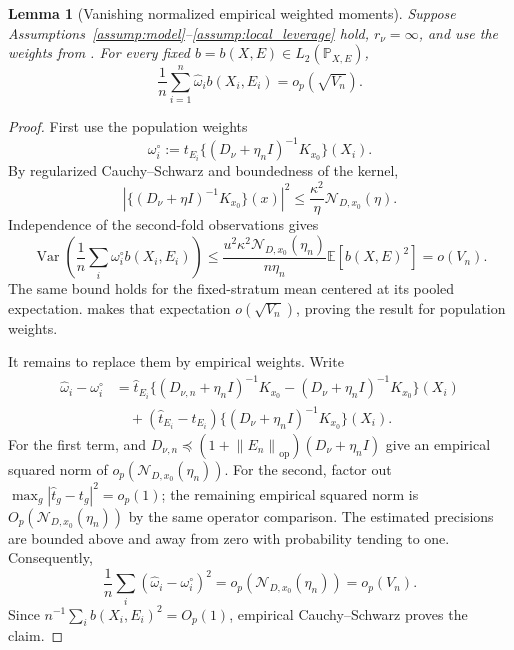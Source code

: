 \documentclass[11pt]{article}
\newtheorem{lemma}{Lemma}[section]
\newcommand{\E}{\mathbb{E}}
\newcommand{\Ncal}{\mathcal{N}}
\newcommand{\op}{\mathrm{op}}
\newcommand{\norm}[1]{\left\lVert #1\right\rVert}
\begin{document}
\begin{lemma}[Vanishing normalized empirical weighted moments]\label{lem:weighted_moments}
Suppose Assumptions~\ref{assump:model}--\ref{assump:local_leverage} hold, $r_\nu=\infty$, and use the weights from . For every fixed $b=b(X,E)\in L_2(\mathbb P_{X,E})$,
\[
 \frac1n\sum_{i=1}^n\widehat\omega_i b(X_i,E_i)=o_p(\sqrt{V_n}).
\]
\end{lemma}
\begin{proof}
First use the population weights
\[
 \omega_i^\circ:=t_{E_i}\{(D_\nu+\eta_n I)^{-1}K_{x_0}\}(X_i).
\]
By regularized Cauchy--Schwarz and boundedness of the kernel,
\[
 |\{(D_\nu+\eta I)^{-1}K_{x_0}\}(x)|^2
 \leq\frac{\kappa^2}{\eta}\Ncal_{D,x_0}(\eta).
\]
Independence of the second-fold observations gives
\[
 \operatorname{Var}\!\left(\frac1n\sum_i\omega_i^\circ b(X_i,E_i)\right)
 \leq\frac{u^2\kappa^2\Ncal_{D,x_0}(\eta_n)}{n\eta_n}\E[b(X,E)^2]
 =o(V_n).
\]
The same bound holds for the fixed-stratum mean centered at its pooled expectation.  makes that expectation $o(\sqrt{V_n})$, proving the result for population weights.

It remains to replace them by empirical weights. Write
\begin{align*}
 \widehat\omega_i-\omega_i^\circ
 &=\widehat t_{E_i}\big\{(D_{\nu,n}+\eta_n I)^{-1}K_{x_0}
              -(D_\nu+\eta_n I)^{-1}K_{x_0}\big\}(X_i)\\
 &\quad+(\widehat t_{E_i}-t_{E_i})\{(D_\nu+\eta_n I)^{-1}K_{x_0}\}(X_i).
\end{align*}
For the first term,  and
$D_{\nu,n}\preceq(1+\norm{E_n}_{\op})(D_\nu+\eta_n I)$ give an empirical squared norm of $o_p(\Ncal_{D,x_0}(\eta_n))$. For the second, factor out $\max_g|\widehat t_g-t_g|^2=o_p(1)$; the remaining empirical squared norm is $O_p(\Ncal_{D,x_0}(\eta_n))$ by the same operator comparison. The estimated precisions are bounded above and away from zero with probability tending to one. Consequently,
\[
 \frac1n\sum_i(\widehat\omega_i-\omega_i^\circ)^2
 =o_p(\Ncal_{D,x_0}(\eta_n))=o_p(V_n).
\]
Since $n^{-1}\sum_i b(X_i,E_i)^2=O_p(1)$, empirical Cauchy--Schwarz proves the claim.
\end{proof}

\end{document}
